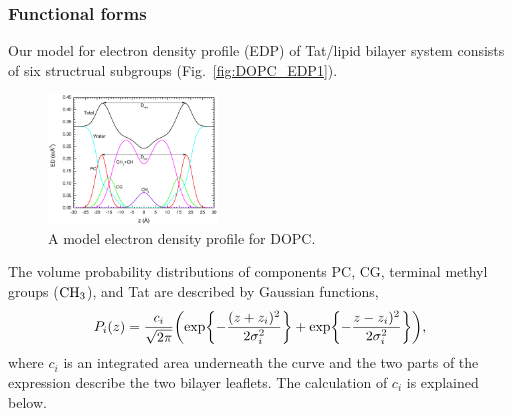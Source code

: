 \subsubsection{Functional forms}
Our model for electron density profile (EDP)
of Tat/lipid bilayer system consists of six structrual subgroups 
(Fig.~\ref{fig:DOPC_EDP1}).
\begin{figure}[htbp]
  \centering
  \includegraphics[width=0.4\textwidth]{figures/Tat/SDP_Results/EDP/DOPC_EDP1}
  \caption{A model electron density profile for DOPC.}
  \label{fig:DOPC_EDP}
\end{figure}
The volume probability distributions of components PC, CG, terminal
methyl groups ($\textrm{CH}_3$), and Tat are described by Gaussian functions,
\begin{equation}
  P_i(z)=\frac{c_i}{\sqrt{2\pi}}\mathopen{}\left( 
    \exp\mathopen{}\left\lbrace -\frac{(z+z_i)^2}{2\sigma_i^2} \right\rbrace\mathclose{}
	+ \exp\mathopen{}\left\lbrace -\frac{z-z_i)^2}{2\sigma_i^2} \right\rbrace\mathclose{}
   \right)\mathclose{},
\end{equation}
where $c_i$ is an integrated area underneath the curve and the two parts of the 
expression describe the two bilayer leaflets. The calculation of $c_i$ is 
explained below.

